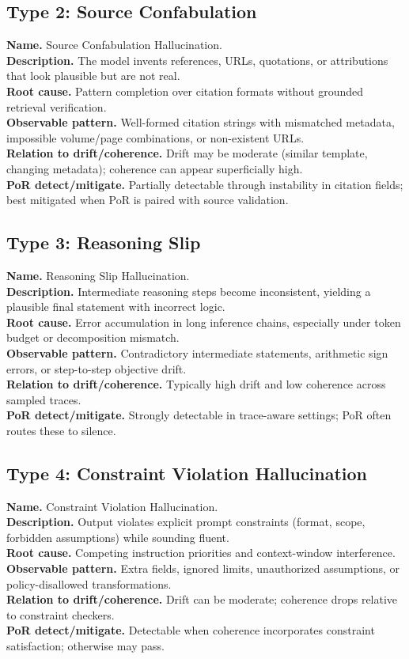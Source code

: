 \documentclass[11pt]{article}
\begin{document}
\subsection{Type 2: Source Confabulation}
\textbf{Name.} Source Confabulation Hallucination.\\
\textbf{Description.} The model invents references, URLs, quotations, or attributions that look plausible but are not real.\\
\textbf{Root cause.} Pattern completion over citation formats without grounded retrieval verification.\\
\textbf{Observable pattern.} Well-formed citation strings with mismatched metadata, impossible volume/page combinations, or non-existent URLs.\\
\textbf{Relation to drift/coherence.} Drift may be moderate (similar template, changing metadata); coherence can appear superficially high.\\
\textbf{PoR detect/mitigate.} Partially detectable through instability in citation fields; best mitigated when PoR is paired with source validation.

\subsection{Type 3: Reasoning Slip}
\textbf{Name.} Reasoning Slip Hallucination.\\
\textbf{Description.} Intermediate reasoning steps become inconsistent, yielding a plausible final statement with incorrect logic.\\
\textbf{Root cause.} Error accumulation in long inference chains, especially under token budget or decomposition mismatch.\\
\textbf{Observable pattern.} Contradictory intermediate statements, arithmetic sign errors, or step-to-step objective drift.\\
\textbf{Relation to drift/coherence.} Typically high drift and low coherence across sampled traces.\\
\textbf{PoR detect/mitigate.} Strongly detectable in trace-aware settings; PoR often routes these to silence.

\subsection{Type 4: Constraint Violation Hallucination}
\textbf{Name.} Constraint Violation Hallucination.\\
\textbf{Description.} Output violates explicit prompt constraints (format, scope, forbidden assumptions) while sounding fluent.\\
\textbf{Root cause.} Competing instruction priorities and context-window interference.\\
\textbf{Observable pattern.} Extra fields, ignored limits, unauthorized assumptions, or policy-disallowed transformations.\\
\textbf{Relation to drift/coherence.} Drift can be moderate; coherence drops relative to constraint checkers.\\
\textbf{PoR detect/mitigate.} Detectable when coherence incorporates constraint satisfaction; otherwise may pass.
\end{document}
